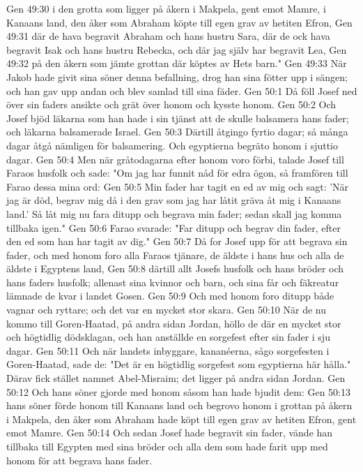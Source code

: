 Gen 49:30  i den grotta som ligger på åkern i Makpela, gent emot Mamre, i Kanaans land, den åker som Abraham köpte till egen grav av hetiten Efron,
Gen 49:31  där de hava begravit Abraham och hans hustru Sara, där de ock hava begravit Isak och hans hustru Rebecka, och där jag själv har begravit Lea,
Gen 49:32  på den åkern som jämte grottan där köptes av Hets barn."
Gen 49:33  När Jakob hade givit sina söner denna befallning, drog han sina fötter upp i sängen; och han gav upp andan och blev samlad till sina fäder.
Gen 50:1  Då föll Josef ned över sin faders ansikte och grät över honom och kysste honom.
Gen 50:2  Och Josef bjöd läkarna som han hade i sin tjänst att de skulle balsamera hans fader; och läkarna balsamerade Israel.
Gen 50:3  Därtill åtgingo fyrtio dagar; så många dagar åtgå nämligen för balsamering. Och egyptierna begräto honom i sjuttio dagar.
Gen 50:4  Men när gråtodagarna efter honom voro förbi, talade Josef till Faraos husfolk och sade: "Om jag har funnit nåd för edra ögon, så framfören till Farao dessa mina ord:
Gen 50:5  Min fader har tagit en ed av mig och sagt: 'När jag är död, begrav mig då i den grav som jag har låtit gräva åt mig i Kanaans land.' Så låt mig nu fara ditupp och begrava min fader; sedan skall jag komma tillbaka igen."
Gen 50:6  Farao svarade: "Far ditupp och begrav din fader, efter den ed som han har tagit av dig."
Gen 50:7  Då for Josef upp för att begrava sin fader, och med honom foro alla Faraos tjänare, de äldste i hans hus och alla de äldste i Egyptens land,
Gen 50:8  därtill allt Josefs husfolk och hans bröder och hans faders husfolk; allenast sina kvinnor och barn, och sina får och fäkreatur lämnade de kvar i landet Gosen.
Gen 50:9  Och med honom foro ditupp både vagnar och ryttare; och det var en mycket stor skara.
Gen 50:10  När de nu kommo till Goren-Haatad, på andra sidan Jordan, höllo de där en mycket stor och högtidlig dödsklagan, och han anställde en sorgefest efter sin fader i sju dagar.
Gen 50:11  Och när landets inbyggare, kananéerna, sågo sorgefesten i Goren-Haatad, sade de: "Det är en högtidlig sorgefest som egyptierna här hålla." Därav fick stället namnet Abel-Misraim; det ligger på andra sidan Jordan.
Gen 50:12  Och hans söner gjorde med honom såsom han hade bjudit dem:
Gen 50:13  hans söner förde honom till Kanaans land och begrovo honom i grottan på åkern i Makpela, den åker som Abraham hade köpt till egen grav av hetiten Efron, gent emot Mamre.
Gen 50:14  Och sedan Josef hade begravit sin fader, vände han tillbaka till Egypten med sina bröder och alla dem som hade farit upp med honom för att begrava hans fader.

